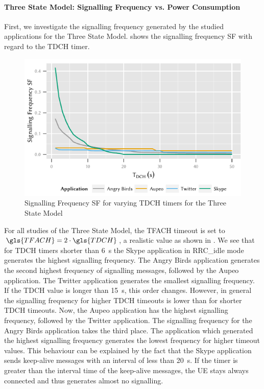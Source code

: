 \paragraph*{Three State Model: Signalling Frequency vs. Power Consumption}\label{sec:network:network_traces:numerical_results:three_states}
First, we investigate the signalling frequency generated by the studied applications for the Three State Model. 
 shows the signalling frequency \gls{SF} with regard to the \gls{TDCH} timer.
\begin{figure}
	\centering
	\includegraphics{network/network_traces/numerical_results/figures/3_state_tdch_vs_frequency}
	\caption{Signalling Frequency \gls{SF} for varying \gls{TDCH} timers for the Three State Model}\label{fig:network:network_traces:numerical_results:three_states:three_states:signalling}
\end{figure}
For all studies of the Three State Model, the \gls{TFACH} timeout is set to \(\gls{TFACH} = 2\cdot  \gls{TDCH}\), a realistic value as shown in \cite{Qian2011a}.
We see that for \gls{TDCH} timers shorter than \SI{6}{\second} the Skype application in \gls{RRC_idle} mode generates the highest signalling frequency.
The Angry Birds application generates the second highest frequency of signalling messages, followed by the Aupeo application.
The Twitter application generates the smallest signalling frequency.
If the \gls{TDCH} value is longer than \SI{15}{\second}, this order changes.
However, in general the signalling frequency for higher \gls{TDCH} timeouts is lower than for shorter \gls{TDCH} timeouts.
Now, the Aupeo application has the highest signalling frequency, followed by the Twitter application.
The signalling frequency for the Angry Birds application takes the third place.
The application which generated the highest signalling frequency generates the lowest frequency for higher timeout values.
This behaviour can be explained by the fact that the Skype application sends keep-alive messages with an interval of less than \SI{20}{\second}.
If the timer is greater than the interval time of the keep-alive messages, the \gls{UE} stays always connected and thus generates almost no signalling.

